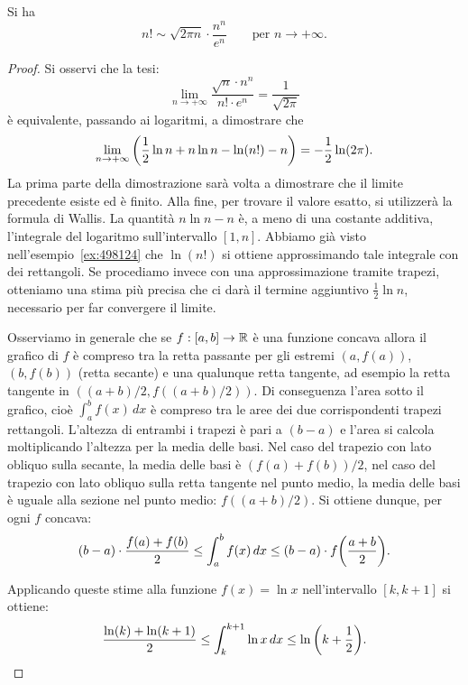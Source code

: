 \begin{theorem}
\mymark{*}
Si ha
\[
  n! \sim \sqrt{2\pi n}\cdot \frac{n^n}{e^n}
  \qquad \text{per $n\to +\infty$.}
\]
\end{theorem}
%
\begin{proof}
Si osservi che la tesi:
\[
  \lim_{n\to +\infty}\frac{\sqrt{n} \cdot n^n}{n!\cdot e^n } = \frac{1}{\sqrt{2\pi}}
\]
è equivalente, passando ai logaritmi, a dimostrare che
\[
   \lim_{n\to +\infty} {\left( \frac 1 2 \ln n + n \ln n - \ln(n!) - n \right)}
   = -\frac 1 2 \ln (2\pi).
\]
La prima parte della dimostrazione sarà volta a dimostrare che il limite
precedente esiste ed è finito. Alla fine, per trovare il valore esatto,
si utilizzerà la formula di Wallis.
La quantità $n\ln n - n$ è, a meno di una costante additiva, l'integrale
del logaritmo sull'intervallo $[1,n]$.
Abbiamo già visto nell'esempio~\ref{ex:498124}
che $\ln(n!)$ si ottiene approssimando tale integrale con dei rettangoli.
Se procediamo invece con una approssimazione tramite trapezi, otteniamo
una stima più precisa che ci darà il termine aggiuntivo $\frac 1 2 \ln n$,
necessario per far convergere il limite.

Osserviamo in generale che se $f:[a,b]\to \mathbb R$ è una funzione concava allora
il grafico di $f$ è compreso tra la retta passante per gli estremi $(a,f(a))$,
$(b,f(b))$ (retta secante) e una qualunque retta tangente, ad esempio la retta
tangente in $((a+b)/2,f((a+b)/2))$.
Di conseguenza l'area sotto il grafico, cioè $\int_a^b f(x)\, dx$ è compreso tra
le aree dei due corrispondenti trapezi rettangoli. L'altezza di entrambi i
trapezi è pari a $(b-a)$ e l'area si calcola moltiplicando l'altezza per la
media delle basi. Nel caso del trapezio con lato obliquo sulla secante, la media
delle basi è $(f(a)+f(b))/2$, nel caso del trapezio con lato obliquo sulla
retta tangente nel punto medio, la media delle basi è uguale alla sezione nel
punto medio: $f((a+b)/2)$. Si ottiene dunque,
per ogni $f$ concava:
\[
   (b-a)\cdot  \frac{f(a) + f(b)}{2}
   \le \int_a^b f(x) \, dx
   \le (b-a) \cdot f{\left( \frac{a+b}{2} \right)}.
\]

Applicando queste stime alla funzione $f(x) = \ln x$ nell'intervallo $[k, k+1]$
si ottiene:
\[
\frac{\ln(k) + \ln(k+1)}{2}
\le \int_k^{k+1} \ln x\, dx
\le \ln {\left( k+\frac 1 2 \right)}.
\]


\end{proof}
